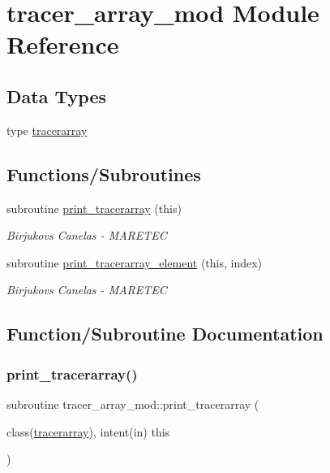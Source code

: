 \hypertarget{namespacetracer__array__mod}{}\section{tracer\+\_\+array\+\_\+mod Module Reference}
\label{namespacetracer__array__mod}
\subsection*{Data Types}
\begin{DoxyCompactItemize}
\item 
type \mbox{\hyperlink{structtracer__array__mod_1_1tracerarray}{tracerarray}}
\end{DoxyCompactItemize}
\subsection*{Functions/\+Subroutines}
\begin{DoxyCompactItemize}
\item 
subroutine \mbox{\hyperlink{namespacetracer__array__mod_a173acbcf343367bf87b705fe5ca0dd29}{print\+\_\+tracerarray}} (this)
\begin{DoxyCompactList}\small\item\em Birjukovs Canelas -\/ M\+A\+R\+E\+T\+EC \end{DoxyCompactList}\item 
subroutine \mbox{\hyperlink{namespacetracer__array__mod_ac3b3896987e589190c759e92e95e05af}{print\+\_\+tracerarray\+\_\+element}} (this, index)
\begin{DoxyCompactList}\small\item\em Birjukovs Canelas -\/ M\+A\+R\+E\+T\+EC \end{DoxyCompactList}\end{DoxyCompactItemize}


\subsection{Function/\+Subroutine Documentation}
\mbox{\label{namespacetracer__array__mod_a173acbcf343367bf87b705fe5ca0dd29}} 
\subsubsection{\texorpdfstring{print\+\_\+tracerarray()}{print\_tracerarray()}}
{\footnotesize\ttfamily subroutine tracer\+\_\+array\+\_\+mod\+::print\+\_\+tracerarray (\begin{DoxyParamCaption}\item[{class(\mbox{\hyperlink{structtracer__array__mod_1_1tracerarray}{tracerarray}}), intent(in)}]{this }\end{DoxyParamCaption})\hspace{0.3cm}{\ttfamily [private]}}



